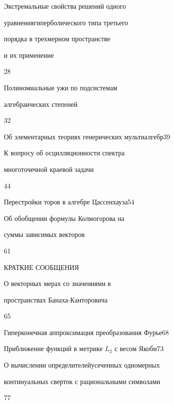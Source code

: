 

{Экстремальные свойства решений одного 


уравнения\newline гиперболического типа третьего 


порядка в трехмерном пространстве  


и их применение}{28}




{Полиномиальные ужи по подсистемам


алгебраических степеней}{32}




{Об элементарных теориях генерических мультиалгебр}{39}




{К вопросу об осцилляционности спектра


многоточечной краевой задачи}{44}




{Перестройки торов в алгебре Цассенхауза}{54}




{Об обобщении формулы Колмогорова на 


суммы зависимых векторов}{61}





\bigskip


{\centerline {КРАТКИЕ СООБЩЕНИЯ}}


\bigskip







{О векторных мерах со значениями в  


пространствах Банаха-Канторовича}{65}




{Гиперконечная аппроксимация преобразования Фурье}{68}




{Приближение функций в метрике $L_2$ с весом Якоби}{73}




{О вычислении определителей\newline усеченных одномерных 


континуальных сверток с рациональными символами}{77}




